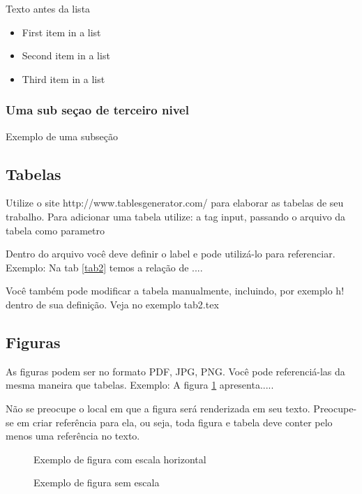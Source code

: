 \documentclass[	DIV=calc,%
							paper=a4,%
							fontsize=12pt,%
							onecolumn]{scrartcl}	 					%
\begin{document}
Texto antes da lista

\begin{itemize}
	\item First item in a list 
	\item Second item in a list 
	\item Third item in a list
\end{itemize}

\subsubsection{Uma sub seçao de terceiro nivel}

Exemplo de uma subseção

\subsection{Tabelas}

Utilize o site http://www.tablesgenerator.com/ para elaborar as tabelas de seu trabalho.
Para adicionar uma tabela utilize: a tag input, passando o arquivo da tabela como parametro


Dentro do arquivo você deve definir o label e pode utilizá-lo para referenciar. Exemplo:
Na tab \ref{tab2} temos a relação de ....


Você também pode modificar a tabela manualmente, incluindo, por exemplo h! dentro de sua definição. Veja no exemplo tab2.tex

\subsection{Figuras}

As figuras podem ser no formato PDF, JPG, PNG. Você pode referenciá-las da mesma maneira que tabelas. Exemplo: A figura \ref{fig1} apresenta.....

Não se preocupe o local em que a figura será renderizada em seu texto. Preocupe-se em criar referência para ela, ou seja, toda figura e tabela deve conter pelo menos uma referência no texto.

\begin{figure}
\centering
\caption{Exemplo de figura com escala horizontal}
\label{fig1}
\end{figure}


\begin{figure}
	\centering
	\caption{Exemplo de figura sem escala}
	\label{fig2}
\end{figure}
\end{document}

